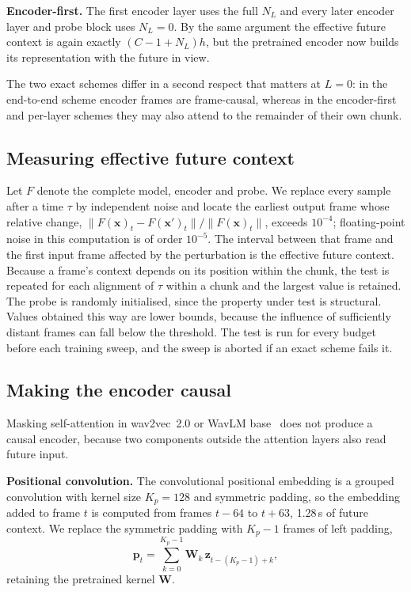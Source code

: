 \documentclass[journal]{IEEEtran}
\begin{document}
\textbf{Encoder-first.} The first encoder layer uses the full $N_L$ and every
later encoder layer and probe block uses $N_L=0$. By the same argument the
effective future context is again exactly $(C-1+N_L)h$, but the pretrained
encoder now builds its representation with the future in view.

The two exact schemes differ in a second respect that matters at $L=0$: in
the end-to-end scheme encoder frames are frame-causal, whereas in the
encoder-first and per-layer schemes they may also attend to the remainder of
their own chunk.

\subsection{Measuring effective future context}
\label{sec:reachtest}

Let $F$ denote the complete model, encoder and probe. We replace every sample
after a time $\tau$ by independent noise and locate the earliest output frame
whose relative change, $\lVert F(\mathbf{x})_t - F(\mathbf{x}')_t\rVert /
\lVert F(\mathbf{x})_t\rVert$, exceeds $10^{-4}$; floating-point noise in this
computation is of order $10^{-5}$. The interval between that frame and the
first input frame affected by the perturbation is the effective future
context. Because a frame's context depends on its position within the chunk,
the test is repeated for each alignment of $\tau$ within a chunk and the
largest value is retained. The probe is randomly initialised, since the
property under test is structural. Values obtained this way are lower bounds,
because the influence of sufficiently distant frames can fall below the
threshold. The test is run for every budget before each training sweep, and
the sweep is aborted if an exact scheme fails it.

\subsection{Making the encoder causal}
\label{sec:causal}

Masking self-attention in wav2vec~2.0 or WavLM base~\cite{wavlm2022, wav2vec2}
does not produce a causal encoder, because two components outside the
attention layers also read future input.

\textbf{Positional convolution.} The convolutional positional embedding is a
grouped convolution with kernel size $K_p=128$ and symmetric padding, so the
embedding added to frame $t$ is computed from frames $t-64$ to $t+63$, 1.28\,s
of future context. We replace the symmetric padding with $K_p-1$ frames of
left padding,
\begin{equation}
\mathbf{p}_t = \sum_{k=0}^{K_p-1} \mathbf{W}_k\, \mathbf{z}_{t-(K_p-1)+k},
\label{eq:posconv}
\end{equation}
retaining the pretrained kernel $\mathbf{W}$.
\end{document}
